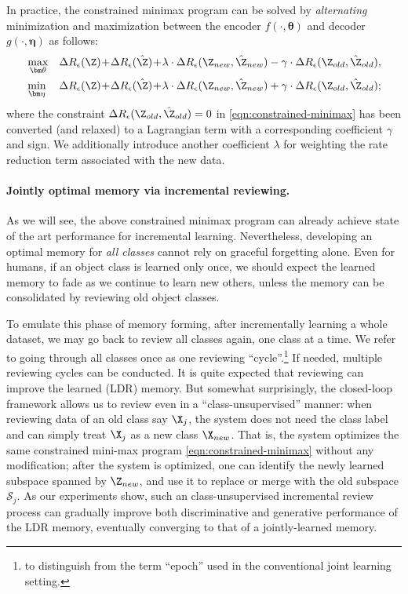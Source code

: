 \documentclass[../../book-main.tex]{subfiles}
\begin{document}
In practice, the constrained minimax program can be solved by {\em alternating}  minimization and maximization between the encoder $f(\cdot, \bm \theta)$ and decoder $g(\cdot, \bm \eta)$ as follows:
\begin{eqnarray}
&\max_{\bm \theta}  &\Delta{R_\epsilon(\Z)}\!+\!\Delta{R_\epsilon(\hat{\Z})}\!+\!\lambda\cdot  \Delta{R_\epsilon(\Z_{new},\hat{\Z}_{new})} - \gamma\cdot \Delta{R_\epsilon(\Z_{old},\hat{\Z}_{old})}, \label{eqn:relaxed-max}\\ 
&\min_{\bm \eta} &\Delta{R_\epsilon(\Z)}\!+\!\Delta{R_\epsilon(\hat{\Z})}\!+\!\lambda\cdot \Delta{R_\epsilon(\Z_{new},\hat{\Z}_{new})} + \gamma\cdot \Delta{R_\epsilon(\Z_{old},\hat{\Z}_{old})}; \label{eqn:relaxed-min}
\end{eqnarray}
where the constraint $\Delta R_\epsilon(\Z_{old},\hat{\Z}_{old}) = 0$ in \eqref{eqn:constrained-minimax} has been converted (and relaxed) to a Lagrangian term with a corresponding coefficient $\gamma$ and sign. We additionally introduce another coefficient $\lambda$ for weighting the rate reduction term associated with the new data. %



\paragraph{Jointly optimal memory via incremental reviewing.} 
As we will see, the above constrained minimax program can already achieve state of the art performance for incremental learning. Nevertheless, developing an optimal memory for {\em all classes} cannot rely on graceful forgetting alone. Even for humans, if an object class is learned only once, we should expect the learned memory to fade as we continue to learn new others, unless the memory can be consolidated by reviewing old object classes. %

To emulate this phase of memory forming, after incrementally learning a whole dataset, we may go back to review all classes again, one class at a time. We refer to going through all classes once as one reviewing ``cycle''.\footnote{to distinguish from the term ``epoch'' used in the conventional joint learning setting.} If needed, multiple reviewing cycles can be conducted. It is quite expected that reviewing can improve the learned (LDR) memory. But somewhat surprisingly, the closed-loop framework allows us to review even in a ``{class-unsupervised}'' manner: when reviewing data of an old class say $\X_j$, the system does not need the class label and can simply treat $\X_j$ as a new class $\X_{new}$. That is, the system optimizes the same constrained mini-max program \eqref{eqn:constrained-minimax} without any modification; after the system is optimized, one can identify the newly learned subspace spanned by $\Z_{new}$, and use it to replace or merge with the old subspace $\mathcal{S}_j$. As our experiments show, such an class-unsupervised incremental review process can gradually improve both discriminative and generative performance of the LDR memory, eventually converging to that of a jointly-learned memory.
\end{document}
